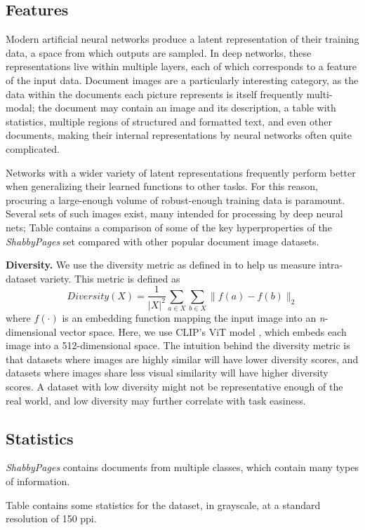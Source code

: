 \documentclass[runningheads]{llncs}
\begin{document}
\subsection{Features}
Modern artificial neural networks produce a latent representation of their training data, a space from which outputs are sampled.
In deep networks, these representations live within multiple layers, each of which corresponds to a feature of the input data.
Document images are a particularly interesting category, as the data within the documents each picture represents is itself frequently multi-modal; the document may contain an image and its description, a table with statistics, multiple regions of structured and formatted text, and even other documents, making their internal representations by neural networks often quite complicated.

Networks with a wider variety of latent representations frequently perform better when generalizing their learned functions to other tasks.
For this reason, procuring a large-enough volume of robust-enough training data is paramount.
Several sets of such images exist, many intended for processing by deep neural nets; Table \cite{tab:datasets} contains a comparison of some of the key hyperproperties of the \emph{ShabbyPages} set compared with other popular document image datasets.

\textbf{Diversity.} We use the diversity metric as defined in \cite{kang-etal-2018-data,larson-etal-2019-outlier} to help us measure intra-dataset variety.
This metric is defined as
$$
Diversity(X) = \frac{1}{|X|^2} \sum_{a\in X} \sum_{b\in X} \|f(a)-f(b)\|_2
$$
where $f(\cdot)$ is an embedding function mapping the input image into an \emph{n}-dimensional vector space.
Here, we use CLIP's ViT model \cite{clip}, which embeds each image into a 512-dimensional space.
The intuition behind the diversity metric is that datasets where images are highly similar will have lower diversity scores, and datasets where images share less visual similarity will have higher diversity scores.
A dataset with low diversity might not be representative enough of the real world, and low diversity may further correlate with task easiness.

\subsection{Statistics}
\emph{ShabbyPages} contains documents from multiple classes, which contain many types of information.

Table \cite{ref:tab1} contains some statistics for the dataset, in grayscale, at a standard resolution of 150 ppi.
\end{document}
